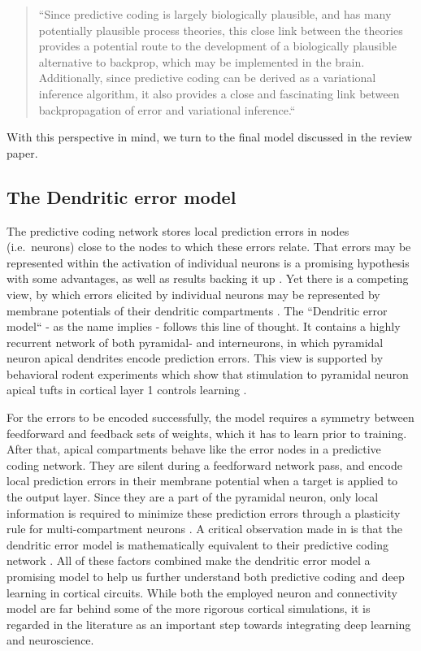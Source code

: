 \begin{quotation}
  \noindent``Since predictive coding is largely biologically plausible, and has many potentially plausible process
  theories, this close link between the theories provides a potential route to the development of a biologically
  plausible alternative to backprop, which may be implemented in the brain. Additionally, since predictive coding can be
  derived as a variational inference algorithm, it also provides a close and fascinating link between backpropagation of
  error and variational inference.`` \citep{millidge2021predictive} \end{quotation}

\noindent With this perspective in mind, we turn to the final model discussed in the review paper.

\subsection{The Dendritic error model}

The predictive coding network stores local prediction errors in nodes (i.e.\ neurons) close to the nodes to which these
errors relate. That errors may be represented within the activation of individual neurons is a promising hypothesis with
some advantages, as well as results backing it up \citep{Hertaeg2022}. Yet there is a competing view, by which errors
elicited by individual neurons may be represented by membrane potentials of their dendritic compartments
\citep{guerguiev2017towards}. The ``Dendritic error model`` \citep{sacramento2018dendritic} - as the name implies -
follows this line of thought. It contains a highly recurrent network of both pyramidal- and interneurons, in which
pyramidal neuron apical dendrites encode prediction errors. This view is supported by behavioral rodent experiments
which show that stimulation to pyramidal neuron apical tufts in cortical layer 1 controls learning \citep{Doron2020}.

For the errors to be encoded successfully, the model requires a symmetry between feedforward and feedback sets of
weights, which it has to learn prior to training. After that, apical compartments behave like the error nodes in a
predictive coding network. They are silent during a feedforward network pass, and encode local prediction errors in
their membrane potential when a target is applied to the output layer. Since they are a part of the pyramidal neuron,
only local information is required to minimize these prediction errors through a plasticity rule for multi-compartment
neurons \citep{urbanczik2014learning}. A critical observation made in \citep{whittington2019theories} is that the
dendritic error model is mathematically equivalent to their predictive coding network . All of these factors combined make the dendritic error model a promising model to help
us further understand both predictive coding and deep learning in cortical circuits. While both the employed neuron and
connectivity model are far behind some of the more rigorous cortical simulations, it is regarded in the literature as an
important step towards integrating deep learning and neuroscience.


